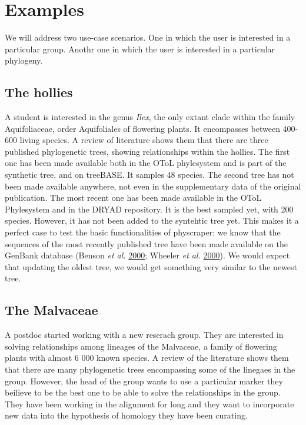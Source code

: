 \documentclass[]{article}
\begin{document}
\hypertarget{examples}{%
\section{Examples}\label{examples}}

We will address two use-case scenarios. One in which the user is interested in a particular group. Anothr one in which the user is interested in a particular phylogeny.

\hypertarget{the-hollies}{%
\subsection{The hollies}\label{the-hollies}}

A student is interested in the genus \emph{Ilex}, the only extant clade within the family Aquifoliaceae, order Aquifoliales of flowering plants.
It encompasses between 400-600 living species. A review of literature shows them that there are three published phylogenetic trees, showing relationships within the hollies.
The first one has been made available both in the OToL phylesystem and is part of the synthetic tree, and on treeBASE. It samples 48 species.
The second tree has not been made available anywhere, not even in the supplementary data of the original publication.
The most recent one has been made available in the OToL Phylesystem and in the DRYAD repository. It is the best sampled yet, with 200 species. However, it has not been added to the syntehtic tree yet.
This makes it a perfect case to test the basic functionalities of physcraper: we know that the sequences of the most recently published tree have been made available on the GenBank database (Benson \emph{et al.} \protect\hyperlink{ref-benson2000genbank}{2000}; Wheeler \emph{et al.} \protect\hyperlink{ref-wheeler2000database}{2000}). We would expect that updating the oldest tree, we would get something very similar to the newest tree.

\hypertarget{the-malvaceae}{%
\subsection{The Malvaceae}\label{the-malvaceae}}

A postdoc started working with a new reserach group. They are interested in solving relationships among lineages of the Malvaceae, a family of flowering plants with almost 6 000 known species.
A review of the literature shows them that there are many phylogenetic trees encompassing some of the linegaes in the group. However, the head of the group wants to use a particular marker they beilieve to be the best one to be able to solve the relationships in the group. They have been working in the alignment for long and they want to incorporate new data into the hypothesis of homology they have been curating.
\end{document}
